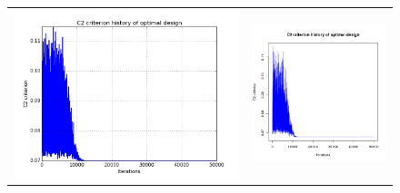 \begin{figure}[!h]
\begin{center}
\begin{tabular}{>{\centering\arraybackslash}m{8cm}>{\centering\arraybackslash}m{8cm}}
 \includegraphics[scale=0.35]{crit_sa_geom.png}   & \includegraphics[scale=0.35]{dice_c2_crit.png}   \\

\end{tabular}
\end{center}
\end{figure}
